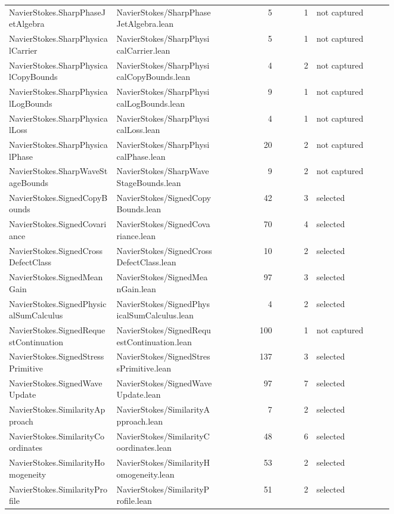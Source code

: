 \documentclass[10pt]{article}
\begin{document}
\begin{longtable}{p{0.28\linewidth}p{0.27\linewidth}r r p{0.20\linewidth}}
NavierStokes.SharpPhaseJetAlgebra & NavierStokes/SharpPhaseJetAlgebra.lean & 5 & 1 & not captured\\
NavierStokes.SharpPhysicalCarrier & NavierStokes/SharpPhysicalCarrier.lean & 5 & 1 & not captured\\
NavierStokes.SharpPhysicalCopyBounds & NavierStokes/SharpPhysicalCopyBounds.lean & 4 & 2 & not captured\\
NavierStokes.SharpPhysicalLogBounds & NavierStokes/SharpPhysicalLogBounds.lean & 9 & 1 & not captured\\
NavierStokes.SharpPhysicalLoss & NavierStokes/SharpPhysicalLoss.lean & 4 & 1 & not captured\\
NavierStokes.SharpPhysicalPhase & NavierStokes/SharpPhysicalPhase.lean & 20 & 2 & not captured\\
NavierStokes.SharpWaveStageBounds & NavierStokes/SharpWaveStageBounds.lean & 9 & 2 & not captured\\
NavierStokes.SignedCopyBounds & NavierStokes/SignedCopyBounds.lean & 42 & 3 & selected\\
NavierStokes.SignedCovariance & NavierStokes/SignedCovariance.lean & 70 & 4 & selected\\
NavierStokes.SignedCrossDefectClass & NavierStokes/SignedCrossDefectClass.lean & 10 & 2 & selected\\
NavierStokes.SignedMeanGain & NavierStokes/SignedMeanGain.lean & 97 & 3 & selected\\
NavierStokes.SignedPhysicalSumCalculus & NavierStokes/SignedPhysicalSumCalculus.lean & 4 & 2 & selected\\
NavierStokes.SignedRequestContinuation & NavierStokes/SignedRequestContinuation.lean & 100 & 1 & not captured\\
NavierStokes.SignedStressPrimitive & NavierStokes/SignedStressPrimitive.lean & 137 & 3 & selected\\
NavierStokes.SignedWaveUpdate & NavierStokes/SignedWaveUpdate.lean & 97 & 7 & selected\\
NavierStokes.SimilarityApproach & NavierStokes/SimilarityApproach.lean & 7 & 2 & selected\\
NavierStokes.SimilarityCoordinates & NavierStokes/SimilarityCoordinates.lean & 48 & 6 & selected\\
NavierStokes.SimilarityHomogeneity & NavierStokes/SimilarityHomogeneity.lean & 53 & 2 & selected\\
NavierStokes.SimilarityProfile & NavierStokes/SimilarityProfile.lean & 51 & 2 & selected\\

\end{longtable}
\end{document}

